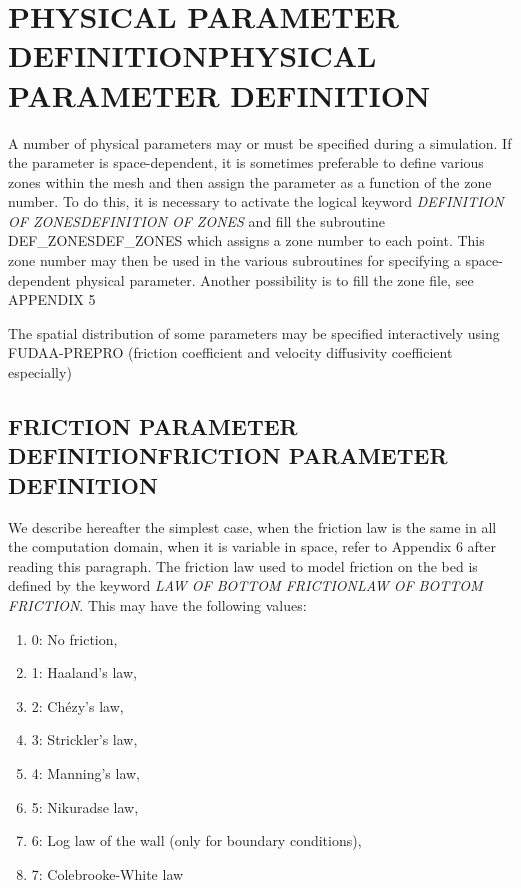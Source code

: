 \documentclass{article} %
\begin{document}
\section{  PHYSICAL PARAMETER DEFINITIONPHYSICAL PARAMETER DEFINITION}

 A number of physical parameters may or must be specified during a simulation. If the parameter is space-dependent, it is sometimes preferable to define various zones within the mesh and then assign the parameter as a function of the zone number. To do this, it is necessary to activate the logical keyword \textit{DEFINITION OF ZONESDEFINITION OF ZONES} and fill the subroutine DEF\_ZONESDEF\_ZONES which assigns a zone number to each point. This zone number may then be used in the various subroutines for specifying a space-dependent physical parameter. Another possibility is to fill the zone file, see APPENDIX 5

 The spatial distribution of some parameters may be specified interactively using FUDAA-PREPRO (friction coefficient and velocity diffusivity coefficient especially)


\subsection{ FRICTION PARAMETER DEFINITIONFRICTION PARAMETER DEFINITION}

 We describe hereafter the simplest case, when the friction law is the same in all the computation domain, when it is variable in space, refer to Appendix 6 after reading this paragraph. The friction law used to model friction on the bed is defined by the keyword \textit{LAW OF BOTTOM FRICTIONLAW OF BOTTOM FRICTION}. This may have the following values:

\begin{enumerate}
\item  0: No friction,

\item  1: Haaland's law,

\item  2: Ch\'{e}zy's law,

\item  3: Strickler's law,

\item  4: Manning's law,

\item  5: Nikuradse law,

\item  6: Log law of the wall (only for boundary conditions),

\item  7: Colebrooke-White law
\end{enumerate}
\end{document}
